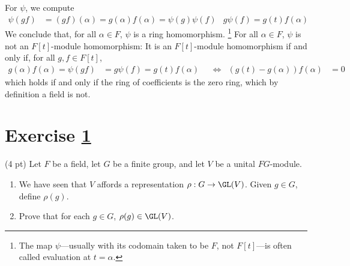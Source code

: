 {For $\psi$, we compute
\begin{align*}
\psi(g f)
&=
(g f)(\alpha)
=
g(\alpha) f(\alpha)
=
\psi(g) \psi(f)
&
g \psi(f)
=
g(t) f(\alpha)
\end{align*}
We conclude that, for all $\alpha \in F$, $\psi$ is a ring homomorphism.%
\footnote{The map $\psi$---usually with its codomain taken to be $F$, not $F[t]$---is often called evaluation at $t = \alpha$.} %
For all $\alpha \in F$, $\psi$ is not an $F[t]$-module homomorphism: It is an $F[t]$-module homomorphism if and only if, for all $g, f \in F[t]$,
\begin{align*}
g(\alpha) f(\alpha)
=
\psi(g f)
&=
g \psi(f)
=
g(t) f(\alpha)
&
&\Leftrightarrow
&
(g(t) - g(\alpha)) f(\alpha)
&=
0
\end{align*}
which holds if and only if the ring of coefficients is the zero ring, which by definition a field is not.}%



\section{Exercise \ref{sec : e01q5}}
\label{sec : e01q5}

(4 pt) Let $F$ be a field, let $G$ be a finite group, and let $V$ be a unital $F G$-module.
\begin{enumerate}[label=(\alph*)]
\item\label{itm : e01q5a} We have seen that $V$ affords a representation $\rho : G \rightarrow \GL(V)$. Given $g \in G$, define $\rho(g)$.
\item\label{itm : e01q5b} Prove that for each $g \in G$, $\rho(g) \in \GL(V)$.
\end{enumerate}

